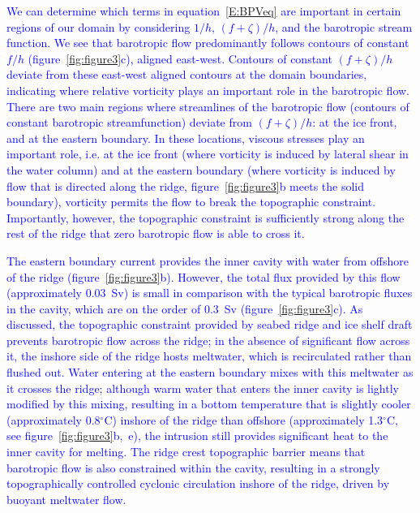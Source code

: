 \documentclass[draft]{agujournal2019}
\newcommand{\blue}[1]{\textcolor{blue}{#1}}
\begin{document}
\blue{We can determine which terms in equation~\eqref{E:BPVeq} are important in certain regions of our domain by considering $1/h$, $(f + \zeta)/h$, and the barotropic stream function. We see that barotropic flow predominantly follows contours of constant $f/h$ (figure~\ref{fig:figure3}c), aligned east-west. Contours of constant $(f + \zeta)/h$ deviate from these east-west aligned contours at the domain boundaries, indicating where relative vorticity plays an important role in the barotropic flow. There are two main regions where streamlines of the barotropic flow (contours of constant barotropic streamfunction) deviate from $(f + \zeta)/h$: at the ice front, and at the eastern boundary. In these locations, viscous stresses play an important role, i.e. at the ice front (where vorticity is induced by lateral shear in the water column) and at the eastern boundary (where vorticity is induced by flow that is directed along the ridge, figure~\ref{fig:figure3}b meets the solid boundary), vorticity permits the flow to break the topographic constraint. Importantly, however, the topographic constraint is sufficiently strong along the rest of the ridge that zero barotropic flow is able to cross it.  }

\blue{The eastern boundary current provides the inner cavity with water from offshore of the ridge (figure~\ref{fig:figure3}b). However, the total flux provided by this flow (approximately 0.03~Sv) is small in comparison with the typical barotropic fluxes in the cavity, which are on the order of 0.3~Sv  (figure~\ref{fig:figure3}c). As discussed, the topographic constraint provided by seabed ridge and ice shelf draft prevents barotropic flow across the ridge; in the absence of significant flow across it, the inshore side of the ridge hosts meltwater, which is recirculated rather than flushed out. Water entering at the eastern boundary mixes with this meltwater as it crosses the ridge; although warm water that enters the inner cavity is lightly modified by this mixing, resulting in a bottom temperature that is slightly cooler (approximately 0.8${}^\circ$C) inshore of the ridge than offshore (approximately 1.3${}^\circ$C, see figure~\ref{fig:figure3}b,~e), the intrusion still provides significant heat to the inner cavity for melting.  The ridge crest topographic barrier means that barotropic flow is also constrained within the cavity, resulting in a strongly topographically controlled cyclonic circulation inshore of the ridge, driven by buoyant meltwater flow. }
\end{document}
